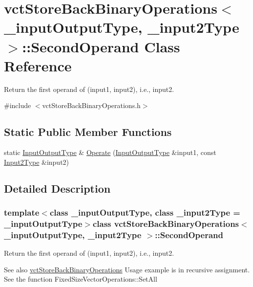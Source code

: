 \hypertarget{classvct_store_back_binary_operations_1_1_second_operand}{}\section{vct\+Store\+Back\+Binary\+Operations$<$ \+\_\+input\+Output\+Type, \+\_\+input2\+Type $>$\+:\+:Second\+Operand Class Reference}
\label{classvct_store_back_binary_operations_1_1_second_operand}


Return the first operand of (input1, input2), i.\+e., input2.  




{\ttfamily \#include $<$vct\+Store\+Back\+Binary\+Operations.\+h$>$}

\subsection*{Static Public Member Functions}
\begin{DoxyCompactItemize}
\item 
static \hyperlink{classvct_store_back_binary_operations_a9dc481d9e1345541dd5d833d5e5688f3}{Input\+Output\+Type} \& \hyperlink{classvct_store_back_binary_operations_1_1_second_operand_a785a2bd98cce814bd044e3731204093c}{Operate} (\hyperlink{classvct_store_back_binary_operations_a9dc481d9e1345541dd5d833d5e5688f3}{Input\+Output\+Type} \&input1, const \hyperlink{classvct_store_back_binary_operations_a65a7197563c794a879fb50a406e70c8f}{Input2\+Type} \&input2)
\end{DoxyCompactItemize}


\subsection{Detailed Description}
\subsubsection*{template$<$class \+\_\+input\+Output\+Type, class \+\_\+input2\+Type = \+\_\+input\+Output\+Type$>$class vct\+Store\+Back\+Binary\+Operations$<$ \+\_\+input\+Output\+Type, \+\_\+input2\+Type $>$\+::\+Second\+Operand}

Return the first operand of (input1, input2), i.\+e., input2. 

\begin{DoxySeeAlso}{See also}
\hyperlink{classvct_store_back_binary_operations}{vct\+Store\+Back\+Binary\+Operations} Usage example is in recursive assignment. See the function Fixed\+Size\+Vector\+Operations\+::\+Set\+All 
\end{DoxySeeAlso}


